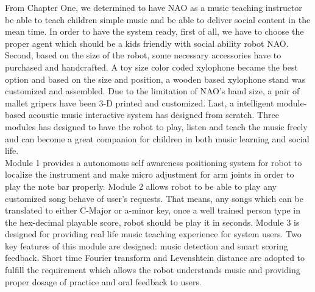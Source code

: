 From Chapter One, we determined to have NAO as a music teaching instructor be able
to teach children simple music and be able to deliver social content in the mean time.
In order to have the system ready, first of all, we have to choose the proper agent which should be a
kids friendly with social ability robot NAO. Second, based on the size of the robot, some necessary
accessories have to purchased and handcrafted. A toy size color coded xylophone became the
best option and based on the size and position, a wooden based xylophone stand was 
customized and assembled. Due to the limitation of NAO's hand size, a pair of mallet gripers 
have been 3-D printed and customized. Last, a intelligent module-based acoustic music 
interactive system has designed from scratch. Three modules has designed to have the
robot to play, listen and teach the music freely and can become a great companion for children
in both music learning and social life. \\

Module 1 provides a autonomous self awareness positioning system for robot to localize
the instrument and make micro adjustment for arm joints in order to play the note bar properly.
Module 2 allows robot to be able to play any customized song behave of user's requests. That
means, any songs which can be translated to either C-Major or a-minor key, once a well trained
person type in the hex-decimal playable score, robot should be play it in seconds. Module 3
is designed for providing real life music teaching experience for system users. Two key features
of this module are designed: music detection and smart scoring feedback. Short time Fourier transform
and Levenshtein distance are adopted to fulfill the requirement which allows the robot understands
music and providing proper dosage of practice and oral feedback to users.\\

